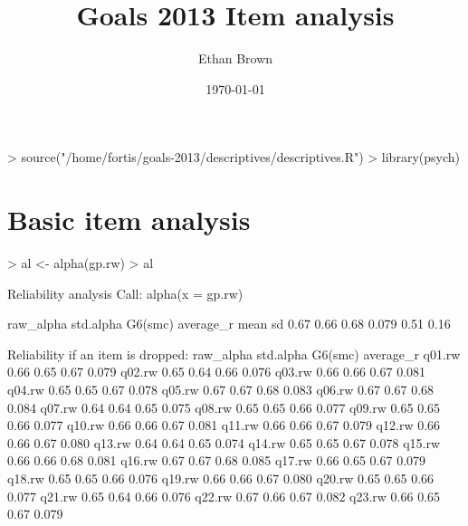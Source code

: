 \documentclass[11pt]{article}
\author{Ethan Brown}
\date{\today}
\title{Goals 2013 Item analysis}
\begin{document}
\maketitle
\begin{Schunk}
\begin{Sinput}
> source("/home/fortis/goals-2013/descriptives/descriptives.R")
> library(psych)
\end{Sinput}
\end{Schunk}

\section{Basic item analysis}
\label{sec-1}

\begin{Schunk}
\begin{Sinput}
> al <- alpha(gp.rw)
> al
\end{Sinput}
\begin{Soutput}
Reliability analysis   
Call: alpha(x = gp.rw)

  raw_alpha std.alpha G6(smc) average_r mean   sd
      0.67      0.66    0.68     0.079 0.51 0.16

 Reliability if an item is dropped:
       raw_alpha std.alpha G6(smc) average_r
q01.rw      0.66      0.65    0.67     0.079
q02.rw      0.65      0.64    0.66     0.076
q03.rw      0.66      0.66    0.67     0.081
q04.rw      0.65      0.65    0.67     0.078
q05.rw      0.67      0.67    0.68     0.083
q06.rw      0.67      0.67    0.68     0.084
q07.rw      0.64      0.64    0.65     0.075
q08.rw      0.65      0.65    0.66     0.077
q09.rw      0.65      0.65    0.66     0.077
q10.rw      0.66      0.66    0.67     0.081
q11.rw      0.66      0.66    0.67     0.079
q12.rw      0.66      0.66    0.67     0.080
q13.rw      0.64      0.64    0.65     0.074
q14.rw      0.65      0.65    0.67     0.078
q15.rw      0.66      0.66    0.68     0.081
q16.rw      0.67      0.67    0.68     0.085
q17.rw      0.66      0.65    0.67     0.079
q18.rw      0.65      0.65    0.66     0.076
q19.rw      0.66      0.66    0.67     0.080
q20.rw      0.65      0.65    0.66     0.077
q21.rw      0.65      0.64    0.66     0.076
q22.rw      0.67      0.66    0.67     0.082
q23.rw      0.66      0.65    0.67     0.079


\end{Soutput}
\end{Schunk}
\end{document}
